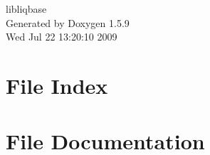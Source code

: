 \documentclass[a4paper]{book}
\begin{document}
\begin{titlepage}
\vspace*{7cm}
\begin{center}
{\Large libliqbase }\\
\vspace*{1cm}
{\large Generated by Doxygen 1.5.9}\\
\vspace*{0.5cm}
{\small Wed Jul 22 13:20:10 2009}\\
\end{center}
\end{titlepage}
\clearemptydoublepage
{}
\tableofcontents
\clearemptydoublepage
{}
\chapter{File Index}

\chapter{File Documentation}











\printindex
\end{document}
